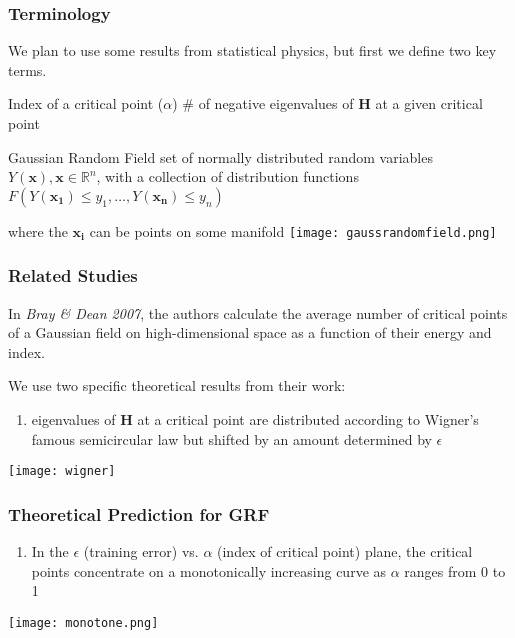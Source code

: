 \documentclass{beamer}
\newcounter{saveenumi}
\newcommand{\seti}{\setcounter{saveenumi}{\value{enumi}}}
\newcommand{\conti}{\setcounter{enumi}{\value{saveenumi}}}
\newcounter{saveenumi}
\newcommand{\seti}{\setcounter{saveenumi}{\value{enumi}}}
\newcommand{\conti}{\setcounter{enumi}{\value{saveenumi}}}
\begin{document}
\begin{frame}
\frametitle{Terminology}

We plan to use some results from statistical physics, but first we define two key terms.
\pause
\vspace{0.05in}
\begin{block}{Index of a critical point ($\alpha$)}
$\#$ of negative eigenvalues of $\bm{H}$ at a given critical point
\end{block}
\pause
\vspace{0.05in}
\begin{block}{Gaussian Random Field}
set of normally distributed random variables $Y(\bm{x}), \bm{x} \in \mathbb{R}^n$, with a collection of distribution functions $ F(Y(\bm{x_1}) \leq y_1, \dots, Y(\bm{x_n}) \leq y_n) $

where the $\bm{x_i}$ can be points on some manifold
\vspace{-0.1in}
\center
\texttt{[image: gaussrandomfield.png]}

\end{block}

\end{frame}


\begin{frame}
\frametitle{Related Studies}

In \textit{Bray \& Dean 2007}, the authors calculate the average number of critical points of a Gaussian field on high-dimensional space as a function of their energy and index.

\vspace{0.1in}
\pause
We use two specific theoretical results from their work:

\begin{enumerate}
\pause
\item{eigenvalues of $\bm{H}$ at a critical point are distributed according to Wigner's famous semicircular law but shifted by an amount determined by $\epsilon$}
\seti
\end{enumerate}

\center
\texttt{[image: wigner]}
\end{frame}

\begin{frame}
\frametitle{Theoretical Prediction for GRF}

\begin{enumerate}
\conti
\item{In the $\epsilon$ (training error) vs. $\alpha$ (index of critical point) plane, the critical points concentrate on a monotonically increasing curve as $\alpha$ ranges from 0 to 1}
\end{enumerate}
\vspace{-0.1in}
\center
\texttt{[image: monotone.png]}

\end{frame}
\end{document}
